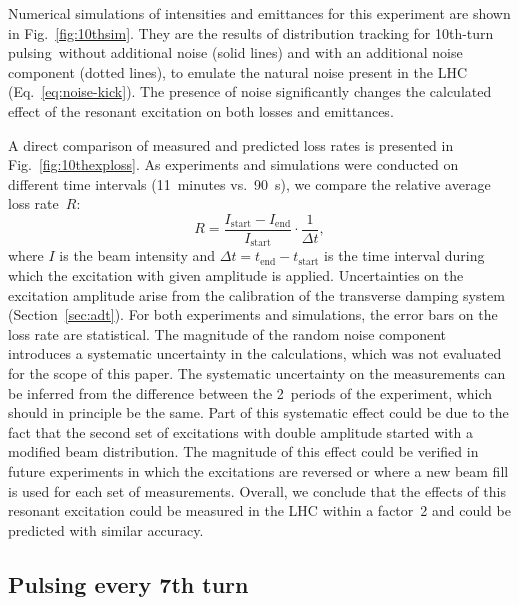\documentclass[%
 reprint,
 amsmath,amssymb,
 aps,
prstab,
longbibliography
]{revtex4-1}
\newcommand{\tenthtp}{10th-turn pulsing}
\begin{document}
Numerical simulations of intensities and emittances for this
experiment are shown in Fig.~\ref{fig:10thsim}. They are the results
of distribution tracking for \tenthtp\ without
additional noise (solid lines) and with an additional noise component
(dotted lines), to emulate the natural noise present in the LHC
(Eq.~\ref{eq:noise-kick}). The presence of noise significantly changes
the calculated effect of the resonant excitation on both losses and
emittances.

A direct comparison of measured and predicted loss rates is presented
in Fig.~\ref{fig:10thexploss}. As experiments and simulations were
conducted on different time intervals (11~minutes vs.\ 90~s), we
compare the relative average loss rate~$R$:
%
\begin{equation}
  \label{eqn:lossrate}
  R = \frac{I_{\mathrm{start}} - I_{\mathrm{end}}}{I_{\mathrm{start}}}
  \cdot \frac{1}{\Delta t},
\end{equation}
%
where $I$ is the beam intensity and
$\Delta t = t_\mathrm{end} - t_\mathrm{start}$ is the time interval
during which the excitation with given amplitude is
applied. Uncertainties on the excitation amplitude arise from the
calibration of the transverse damping system
(Section~\ref{sec:adt}). For both experiments and simulations, the
error bars on the loss rate are statistical. The magnitude of the
random noise component introduces a systematic uncertainty in the
calculations, which was not evaluated for the scope of this paper. The
systematic uncertainty on the measurements can be inferred from the
difference between the 2~periods of the experiment, which should in
principle be the same. Part of this systematic effect could be due to
the fact that the second set of excitations with double amplitude
started with a modified beam distribution. The magnitude of this
effect could be verified in future experiments in which the
excitations are reversed or where a new beam fill is used for each set
of measurements. Overall, we conclude that the effects of this
resonant excitation could be measured in the LHC within a factor~2 and
could be predicted with similar accuracy.



\subsection{Pulsing every 7th turn}
\label{sec:simex7}
\end{document}
